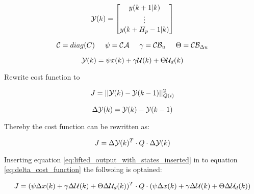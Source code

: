 \begin{equation}
	\CMcal{Y}(k)= 
	\begin{bmatrix}
	y(k+1|k)\\
	\vdots\\
	y(k+H_p-1|k)
	\end{bmatrix}
\end{equation}



\begin{equation}
	\CMcal{C} = diag(C) \hspace{5mm} \psi = \CMcal{C}\CMcal{A}  \hspace{5mm} \gamma = \CMcal{C}\CMcal{B}_u \hspace{5mm}  \Theta = \CMcal{C}\CMcal{B}_{\Delta u}
\end{equation}

\begin{equation}\label{eq:lifted_output_with_states_inserted}
	\CMcal{Y}(k) = \psi x(k) + \gamma \CMcal{U}(k) + \Theta \CMcal{U}_d(k)
\end{equation}





Rewrite cost function to

\begin{equation}
	J = ||\CMcal{Y}(k)-\CMcal{Y}(k-1)||_{Q(i)}^2
\end{equation}

\begin{equation}
	\Delta \CMcal{Y}(k) =\CMcal{Y}(k)-\CMcal{Y}(k-1) 
\end{equation}

Thereby the cost function can be rewritten as:

\begin{equation}\label{eq:delta_cost_function}
	J = \Delta\CMcal{Y}(k)^T \cdot Q \cdot \Delta\CMcal{Y}(k)
\end{equation}

Inserting equation \ref{eq:lifted_output_with_states_inserted} in to equation \ref{eq:delta_cost_function} the follwoing is optained:

\begin{equation}
	J = (\psi\Delta x(k) + \gamma\Delta \CMcal{U}(k) + \Theta\Delta \CMcal{U}_d(k))^T\cdot Q \cdot (\psi\Delta x(k) + \gamma\Delta \CMcal{U}(k) + \Theta\Delta \CMcal{U}_d(k))
\end{equation}

